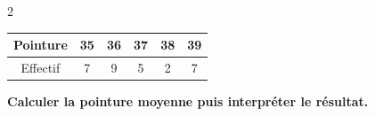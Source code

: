 \documentclass[11pt,a4paper,landscape]{article}
\newcommand{\lignepointillee}{%
  \noindent\dotfill\par
  \vspace{0.18em}
}
\newcommand{\deuxlignes}{%
  \lignepointillee
  \lignepointillee
}
\begin{document}
\begin{multicols*}{2}
\begin{center}

\renewcommand{\arraystretch}{1.15}

\begin{tabular}{|c|c|c|c|c|c|}
\hline

Pointure
& 35
& 36
& 37
& 38
& 39
\\
\hline

Effectif
& 7
& 9
& 5
& 2
& 7
\\
\hline

\end{tabular}

\end{center}

\textbf{Calculer la pointure moyenne puis interpréter le résultat.}

\deuxlignes





\end{multicols*}


%
%
%
%
%
%
%
%
%
%
%
%
%
%
%
%
%
%
%
%
%
%
%
%
%
%
%
%
%
%
%
%
%
%
%
%
%
%
%
%
%
%
%
%
%
\end{document}

